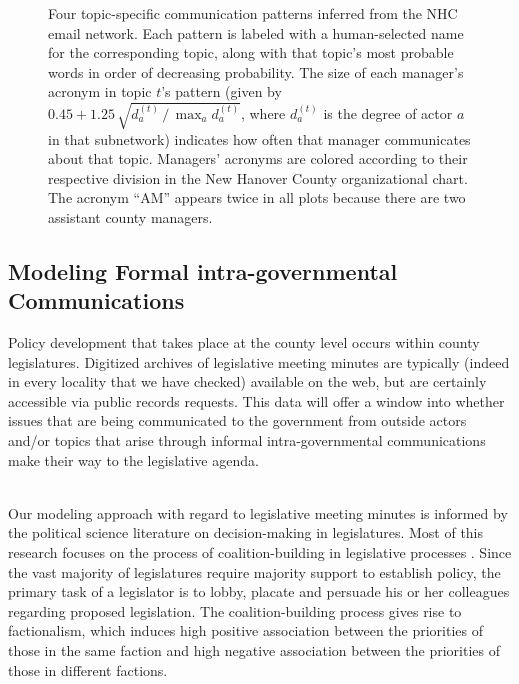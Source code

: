 \begin{figure}[t]
\begin{minipage}{0.5\linewidth}
\end{minipage}
\caption{Four topic-specific communication patterns inferred from the
  NHC email network. Each pattern is labeled with a human-selected
  name for the corresponding topic, along with that topic's most
  probable words in order of decreasing probability. The size of each
  manager's acronym in topic $t$'s pattern (given by $0.45 +
  1.25\,\sqrt{d^{(t)}_a \,/\, \max_a d^{(t)}_a}$, where $d^{(t)}_a$ is
  the degree of actor $a$ in that subnetwork) indicates how often that
  manager communicates about that topic.  Managers' acronyms are
  colored according to their respective division in the New
  Hanover County organizational chart. The acronym ``AM'' appears
  twice in all plots because there are two assistant county managers.}
\label{Figure:LatentSpace}
\end{figure}


\subsection{Modeling Formal intra-governmental Communications}

  Policy development that takes place at the county level occurs within county legislatures. Digitized archives of legislative meeting minutes are typically (indeed in every locality that we have checked) available on the web, but are certainly accessible via public records requests. This data will offer a window into whether issues that are being communicated to the government from outside actors and/or topics that arise through informal intra-governmental communications make their way to the legislative agenda. 

~\\
 Our modeling approach with regard to legislative meeting minutes is informed by the political science literature on decision-making in legislatures. Most of this research focuses on the process of coalition-building in legislative processes \cite{Aldrich1995}. Since the vast majority of legislatures require majority support to establish policy, the primary task of a legislator is to lobby, placate and persuade his or her colleagues regarding proposed legislation. The coalition-building process gives rise to factionalism, which induces high positive association between the priorities of those in the same faction and high negative association between the priorities of those in different factions. 

